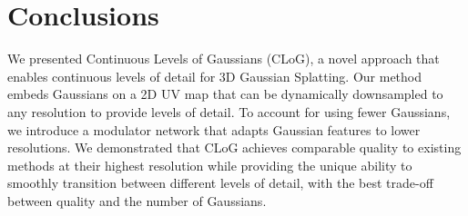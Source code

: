 \section{Conclusions}

  We presented Continuous Levels of Gaussians (CLoG), a novel approach that
  enables continuous levels of detail for 3D Gaussian Splatting.
  Our method embeds Gaussians on a 2D UV map that can be dynamically
  downsampled to any resolution to provide levels of detail.
  To account for using fewer Gaussians, we introduce a modulator network that
  adapts Gaussian features to lower resolutions.
  We demonstrated that CLoG achieves comparable quality to existing methods at
  their highest resolution while providing the unique ability to smoothly
  transition between different levels of detail, with the best trade-off
  between quality and the number of Gaussians.
